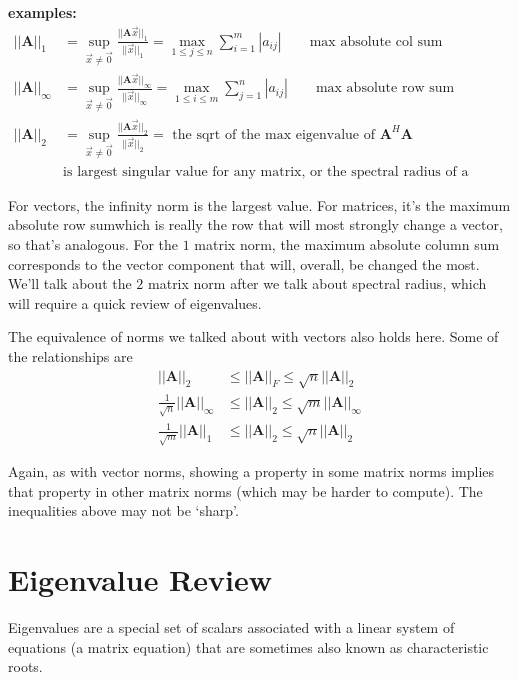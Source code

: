 \documentclass[12pt]{article}
\newcommand{\ve}[1]{\ensuremath{\mathbf{#1}}}
\begin{document}
\textbf{examples:}
%
\begin{align}
||\ve{A}||_{1} &= \displaystyle \sup_{\vec{x} \neq \vec{0}} \frac{||\ve{A}\vec{x}||_{1}}{||\vec{x}||_{1}} =
\displaystyle \max_{1 \leq j \leq n} \sum_{i=1}^m |a_{ij}| \qquad \text{max absolute col sum} \nonumber \\
%
||\ve{A}||_{\infty} &= \displaystyle \sup_{\vec{x} \neq \vec{0}} \frac{||\ve{A}\vec{x}||_{\infty}}{||\vec{x}||_{\infty}} = 
\displaystyle \max_{1 \leq i \leq m} \sum_{j=1}^n |a_{ij}| \qquad \text{max absolute row sum}\nonumber \\
%
||\ve{A}||_{2} &= \displaystyle \sup_{\vec{x} \neq \vec{0}} \frac{||\ve{A}\vec{x}||_{2}}{||\vec{x}||_{2}} = \text{ the sqrt of the max  eigenvalue of }\ve{A}^H\ve{A} \nonumber \\
&\text{is largest singular value for any matrix, or the spectral radius of a square matrix} \nonumber 
\end{align}

For vectors, the infinity norm is the largest value. For matrices, it's the maximum absolute row sum\textemdash which is really the row that will most strongly change a vector, so that's analogous. For the $1$ matrix norm, the maximum absolute column sum corresponds to the vector component that will, overall, be changed the most. We'll talk about the $2$ matrix norm after we talk about spectral radius, which will require a quick review of eigenvalues.

The equivalence of norms we talked about with vectors also holds here. Some of the relationships are
%
\begin{align}
||\ve{A}||_{2} &\leq ||\ve{A}||_{F} \leq \sqrt{n}||\ve{A}||_{2} \nonumber \\
%
\frac{1}{\sqrt{n}}||\ve{A}||_{\infty} &\leq ||\ve{A}||_{2} \leq \sqrt{m}||\ve{A}||_{\infty} \nonumber \\
%
\frac{1}{\sqrt{m}}||\ve{A}||_{1} &\leq ||\ve{A}||_{2} \leq \sqrt{n}||\ve{A}||_{2} \nonumber
\end{align}

Again, as with vector norms, showing a property in some matrix norms implies that property in other matrix norms (which may be harder to compute). The inequalities above may not be `sharp'.

\section*{Eigenvalue Review}

Eigenvalues are a special set of scalars associated with a linear system of equations (a matrix equation) that are sometimes also known as characteristic roots. 
\end{document}
